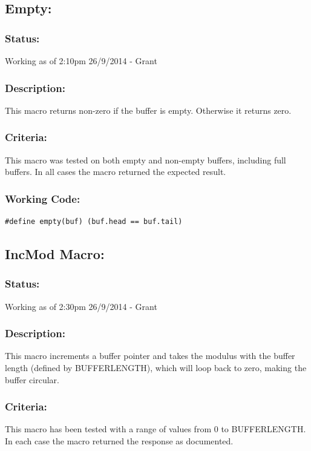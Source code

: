 \documentclass[]{report}
\begin{document}
\subsection{Empty:}
\subsubsection{Status:}
Working as of 2:10pm 26/9/2014 - Grant

\subsubsection{Description:}
This macro returns non-zero if the buffer is empty. Otherwise it returns zero.

\subsubsection{Criteria:}
This macro was tested on both empty and non-empty buffers, including full buffers. In all cases the macro returned the expected result.

\subsubsection{Working Code:}
\begin{lstlisting}
#define empty(buf) (buf.head == buf.tail)
\end{lstlisting}

\subsection{IncMod Macro:}
\subsubsection{Status:}
Working as of 2:30pm 26/9/2014 - Grant

\subsubsection{Description:}
This macro increments a buffer pointer and takes the modulus with the buffer length (defined by BUFFERLENGTH), which will loop back to zero, making the buffer circular.

\subsubsection{Criteria:}
This macro has been tested with a range of values from 0 to BUFFERLENGTH. In each case the macro returned the response as documented.
\end{document}
